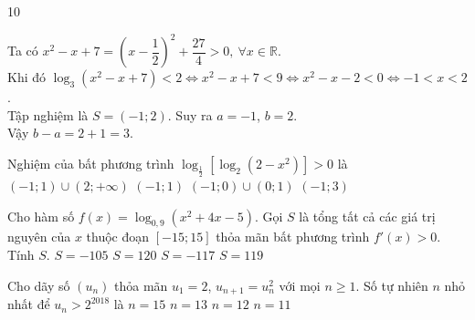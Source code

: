 \begin{indapan}{10}
\begin{ex}
{		Ta có $x^2-x+7=\left(x-\dfrac{1}{2}\right)^2+\dfrac{27}{4}>0,\ \forall x\in\mathbb{R}$.\\
		Khi đó $\log _3\left(x^2-x+7\right)<2 \Leftrightarrow x^2-x+7<9 \Leftrightarrow x^2-x-2<0 \Leftrightarrow-1<x<2$.\\
		Tập nghiệm là $S=(-1;  2)$. Suy ra $a=-1$, $b=2$.\\
		Vậy $b-a=2+1=3$.
	}
\end{ex}
\begin{ex}
	Nghiệm của bất phương trình $\log_{\tfrac{1}{2}}\left[\log_2(2-x^2)\right]>0$ là
	\choice
	{$(-1;1)\cup (2;+\infty)$}
	{$(-1;1)$}
	{\True $(-1;0)\cup (0;1)$}
	{$(-1;3)$}
\end{ex}
\begin{ex}
	Cho hàm số $f(x)=\log_{0{,}9} \left(x^2+4x-5\right)$. Gọi $S$ là tổng tất cả các giá trị nguyên của $x$ thuộc đoạn $[-15;15]$ thỏa mãn bất phương trình $f'(x)>0$. Tính $S$.
	\choice
	{\True $S=-105$}
	{$S=120$}
	{$S=-117$}
	{$S=119$}
\end{ex}
\begin{ex}
	Cho dãy số $\left(u_n\right)$ thỏa mãn $u_1=2$, $u_{n+1}=u_n^2$ với mọi $n\ge 1$. Số tự nhiên $n$ nhỏ nhất để $u_n>2^{2018}$ là
	\choice
	{$n=15$}
	{$n=13$}
	{\True $n=12$}
	{$n=11$}

\end{ex}
\end{indapan}
